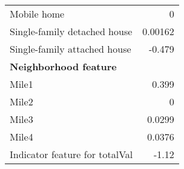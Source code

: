 \begin{table}[H]
\begin{tabular}{|p{6cm}|r|}
		Mobile home  & 0 \\
		Single-family detached house  & 0.00162 \\ 
		Single-family attached house  & -0.479 \\
		\hline
		\textbf{Neighborhood feature} & \\
		Mile1 & 0.399 \\ 
		Mile2 &    0 \\ 
		Mile3 & 0.0299 \\ 
		Mile4 & 0.0376 \\
		\hline
		Indicator feature for totalVal & -1.12 \\ 
		\hline
	\end{tabular}
	\label{tab: model coefficients}
\end{table}